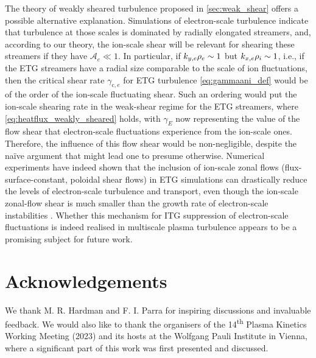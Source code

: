 \documentclass{jpp}
\newcommand{\gammaE}{\gamma_{E}}
\newcommand{\A}{\mathcal{A}}
\begin{document}
The theory of weakly sheared turbulence proposed in \cref{sec:weak_shear} offers a possible alternative explanation. Simulations of electron-scale turbulence indicate that turbulence at those scales is dominated by radially elongated streamers, and, according to our theory, the ion-scale \exb{} shear will be relevant for shearing these streamers if they have \(\A_{e} \ll 1\). In particular, if \(k_{y, e} \rho_e \sim 1\) but \(k_{x, e} \rho_i \sim 1\), i.e., if the ETG streamers have a radial size comparable to the scale of ion fluctuations, then the critical shear rate \(\gamma_{\text{c},e}\) for ETG turbulence \cref{eq:gammaani_def} would be of the order of the ion-scale fluctuating \exb{} shear. Such an ordering would put the ion-scale shearing rate in the weak-shear regime for the ETG streamers, where \cref{eq:heatflux_weakly_sheared} holds, with \(\gammaE\) now representing the value of the flow shear that electron-scale fluctuations experience from the ion-scale ones. Therefore, the influence of this flow shear would be non-negligible, despite the na\"ive argument that might lead one to presume otherwise. Numerical experiments have indeed shown that the inclusion of ion-scale zonal flows (flux-surface-constant, poloidal \exb{} shear flows) in ETG simulations can drastically reduce the levels of electron-scale turbulence and transport, even though the ion-scale zonal-flow shear is much smaller than the growth rate of electron-scale instabilities \citep{waltz07}. Whether this mechanism for ITG suppression of electron-scale fluctuations is indeed realised in multiscale plasma turbulence appears to be a promising subject for future work.

\section*{Acknowledgements}
We thank M. R. Hardman and F. I. Parra for inspiring discussions and invaluable feedback. We would also like to thank the organisers of the 14\textsuperscript{th} Plasma Kinetics Working Meeting (2023) and its hosts at the Wolfgang Pauli Institute in Vienna, where a significant part of this work was first presented and discussed.
\end{document}
